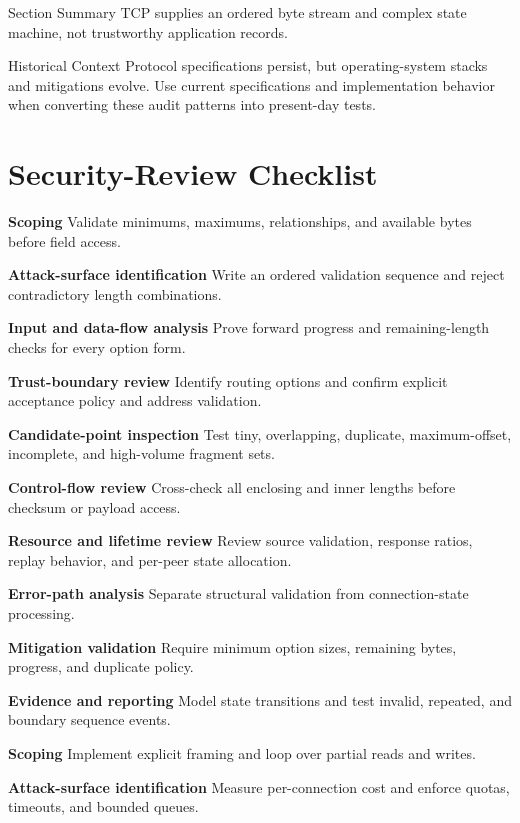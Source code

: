 \documentclass[11pt,letterpaper]{article}
\begin{document}
\begin{CornellSummaryBox}{Section Summary}
TCP supplies an ordered byte stream and complex state machine, not trustworthy application records.
\end{CornellSummaryBox}
\begin{CornellLegacyBox}{Historical Context}
Protocol specifications persist, but operating-system stacks and mitigations evolve. Use current specifications and implementation behavior when converting these audit patterns into present-day tests.
\end{CornellLegacyBox}
\section{Security-Review Checklist}
\begin{CornellChecklist}
\item \textbf{Scoping}
Validate minimums, maximums, relationships, and available bytes before field access.
\item \textbf{Attack-surface identification}
Write an ordered validation sequence and reject contradictory length combinations.
\item \textbf{Input and data-flow analysis}
Prove forward progress and remaining-length checks for every option form.
\item \textbf{Trust-boundary review}
Identify routing options and confirm explicit acceptance policy and address validation.
\item \textbf{Candidate-point inspection}
Test tiny, overlapping, duplicate, maximum-offset, incomplete, and high-volume fragment sets.
\item \textbf{Control-flow review}
Cross-check all enclosing and inner lengths before checksum or payload access.
\item \textbf{Resource and lifetime review}
Review source validation, response ratios, replay behavior, and per-peer state allocation.
\item \textbf{Error-path analysis}
Separate structural validation from connection-state processing.
\item \textbf{Mitigation validation}
Require minimum option sizes, remaining bytes, progress, and duplicate policy.
\item \textbf{Evidence and reporting}
Model state transitions and test invalid, repeated, and boundary sequence events.
\item \textbf{Scoping}
Implement explicit framing and loop over partial reads and writes.
\item \textbf{Attack-surface identification}
Measure per-connection cost and enforce quotas, timeouts, and bounded queues.
\end{CornellChecklist}
\end{document}
